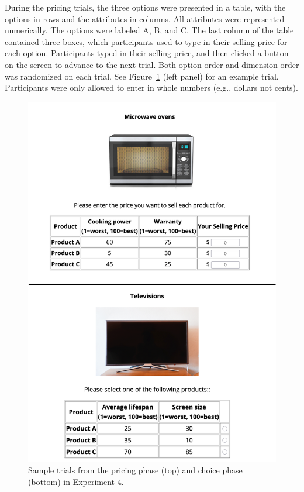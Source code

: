 During the pricing trials, the three options were presented in a table, with the options in rows and the attributes in columns. All attributes were represented numerically. The options were labeled A, B, and C. The last column of the table contained three boxes, which participants used to type in their selling price for each option. Participants typed in their selling price, and then clicked a button on the screen to advance to the next trial. Both option order and dimension order was randomized on each trial. See Figure~\ref{fig:ce_rating_choice_trial} (left panel) for an example trial. Participants were only allowed to enter in whole numbers (e.g., dollars not cents).

\begin{figure}
    \includegraphics{figures/ce_rating_choice_example_trial.jpg}
    \caption{Sample trials from the pricing phase (top) and choice phase (bottom) in Experiment 4.}
    \label{fig:ce_rating_choice_trial}
\end{figure}

